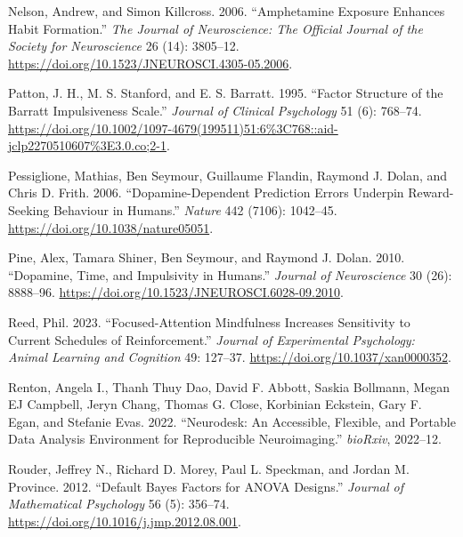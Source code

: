 \documentclass{article}
\newlength{\cslhangindent}
\newlength{\cslentryspacingunit} %
\newenvironment{CSLReferences}[2] %
 {%
  \setlength{\parindent}{0pt}
  \ifodd #1
  \let\oldpar\par
  \def\par{\hangindent=\cslhangindent\oldpar}
  \fi
  \setlength{\parskip}{#2\cslentryspacingunit}
 }%
 {}
\begin{document}
\begin{CSLReferences}{1}{0}
\leavevmode{}%
Nelson, Andrew, and Simon Killcross. 2006. {``Amphetamine Exposure
Enhances Habit Formation.''} \emph{The Journal of Neuroscience: The
Official Journal of the Society for Neuroscience} 26 (14): 3805--12.
\url{https://doi.org/10.1523/JNEUROSCI.4305-05.2006}.

\leavevmode{}%
Patton, J. H., M. S. Stanford, and E. S. Barratt. 1995. {``Factor
Structure of the {Barratt} Impulsiveness Scale.''} \emph{Journal of
Clinical Psychology} 51 (6): 768--74.
\url{https://doi.org/10.1002/1097-4679(199511)51:6\%3C768::aid-jclp2270510607\%3E3.0.co;2-1}.

\leavevmode{}%
Pessiglione, Mathias, Ben Seymour, Guillaume Flandin, Raymond J. Dolan,
and Chris D. Frith. 2006. {``Dopamine-Dependent Prediction Errors
Underpin Reward-Seeking Behaviour in Humans.''} \emph{Nature} 442
(7106): 1042--45. \url{https://doi.org/10.1038/nature05051}.

\leavevmode{}%
Pine, Alex, Tamara Shiner, Ben Seymour, and Raymond J. Dolan. 2010.
{``Dopamine, {Time}, and {Impulsivity} in {Humans}.''} \emph{Journal of
Neuroscience} 30 (26): 8888--96.
\url{https://doi.org/10.1523/JNEUROSCI.6028-09.2010}.

\leavevmode{}%
Reed, Phil. 2023. {``Focused-Attention Mindfulness Increases Sensitivity
to Current Schedules of Reinforcement.''} \emph{Journal of Experimental
Psychology: Animal Learning and Cognition} 49: 127--37.
\url{https://doi.org/10.1037/xan0000352}.

\leavevmode{}%
Renton, Angela I., Thanh Thuy Dao, David F. Abbott, Saskia Bollmann,
Megan EJ Campbell, Jeryn Chang, Thomas G. Close, Korbinian Eckstein,
Gary F. Egan, and Stefanie Evas. 2022. {``Neurodesk: {An} Accessible,
Flexible, and Portable Data Analysis Environment for Reproducible
Neuroimaging.''} \emph{bioRxiv}, 2022--12.

\leavevmode{}%
Rouder, Jeffrey N., Richard D. Morey, Paul L. Speckman, and Jordan M.
Province. 2012. {``Default {Bayes} Factors for {ANOVA} Designs.''}
\emph{Journal of Mathematical Psychology} 56 (5): 356--74.
\url{https://doi.org/10.1016/j.jmp.2012.08.001}.


\end{CSLReferences}
\end{document}
